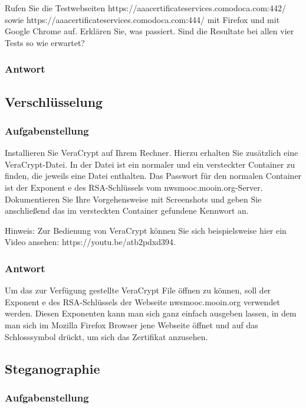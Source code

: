 \documentclass{article}
\begin{document}
Rufen Sie die Testwebseiten https://aaacertificateservices.comodoca.com:442/ sowie 
https://aaacertificateservices.comodoca.com:444/  mit Firefox und mit Google 
Chrome auf. Erklären Sie, was passiert. Sind die Resultate bei allen vier Tests so 
wie erwartet?

\subsubsection*{Antwort}


\newpage

\subsection{Verschlüsselung}

\subsubsection*{Aufgabenstellung}

Installieren Sie VeraCrypt  auf Ihrem Rechner. Hierzu erhalten Sie zusätzlich eine 
VeraCrypt-Datei. In der Datei ist ein normaler und ein versteckter Container 
zu finden, die jeweils eine Datei enthalten. Das Passwort für den normalen 
Container ist der Exponent e des RSA-Schlüssels vom nwsmooc.mooin.org-Server. 
Dokumentieren Sie Ihre Vorgehensweise mit Screenshots und geben Sie 
anschließend das im versteckten Container gefundene Kennwort an.

Hinweis: Zur Bedienung von VeraCrypt können Sie sich beispielsweise hier ein Video 
ansehen: https://youtu.be/atb2pdxd394.

\subsubsection*{Antwort}

Um das zur Verfügung gestellte VeraCrypt File öffnen zu können, soll der Exponent 
e des RSA-Schlüssels der Webseite nwsmooc.mooin.org verwendet werden. Diesen 
Exponenten kann man sich ganz einfach ausgeben lassen, in dem man sich im Mozilla 
Firefox Browser jene Webseite öffnet und auf das Schlosssymbol drückt, um sich das 
Zertifikat anzusehen.

\newpage

\subsection{Steganographie}

\subsubsection*{Aufgabenstellung}
\end{document}
